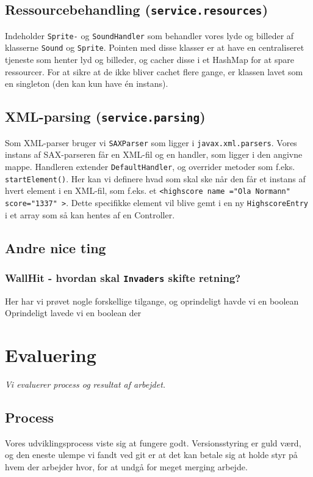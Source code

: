\documentclass[titlepage,danish]{article}
\newcommand{\code}[1]{\texttt{#1}}
\begin{document}
\subsection{Ressourcebehandling (\code{service.resources})}
Indeholder \code{Sprite-} og \code{SoundHandler} som behandler vores lyde og billeder af klasserne \code{Sound} og \code{Sprite}. Pointen med disse klasser er at have en centraliseret tjeneste som henter lyd og billeder, og cacher disse i et HashMap for at spare ressourcer. For at sikre at de ikke bliver cachet flere gange, er klassen lavet som en singleton (den kan kun have én instans).

\subsection{XML-parsing (\code{service.parsing})}
Som XML-parser bruger vi \code{SAXParser} som ligger i \code{javax.xml.parsers}. Vores instans af SAX-parseren får en XML-fil og en handler, som ligger i den angivne mappe. Handleren extender \code{DefaultHandler}, og overrider metoder som f.eks. \code{startElement()}. Her kan vi definere hvad som skal ske når den får et instans af hvert element i en XML-fil, som f.eks. et \code{\textless highscore name ="Ola Normann" score="1337" \textgreater}. Dette specifikke element vil blive gemt i en ny \code{HighscoreEntry} i et array som så kan hentes af en Controller.

\subsection{Andre nice ting}
\subsubsection{WallHit - hvordan skal \code{Invaders} skifte retning?}
Her har vi prøvet nogle forskellige tilgange, og oprindeligt havde vi en boolean
Oprindeligt lavede vi en boolean der

\section{Evaluering}
\emph{Vi evaluerer process og resultat af arbejdet.}
\subsection{Process}
Vores udviklingsprocess viste sig at fungere godt. Versionsstyring er guld værd, og den eneste
ulempe vi fandt ved git er at det kan betale sig at holde styr på hvem der arbejder hvor, for at
undgå for meget merging arbejde.
\end{document}
